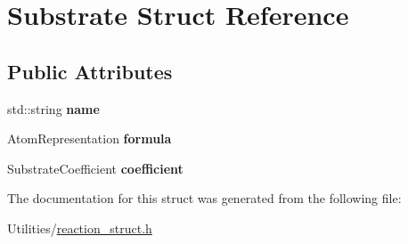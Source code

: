\hypertarget{struct_substrate}{}\section{Substrate Struct Reference}
\label{struct_substrate}
\subsection*{Public Attributes}
\begin{DoxyCompactItemize}
\item 
\mbox{\label{struct_substrate_aad4fceaa8aab6cbcac808dbbba666ef0}} 
std\+::string {\bfseries name}
\item 
\mbox{\label{struct_substrate_ada4d63f52eb096f47e33afe25062a173}} 
Atom\+Representation {\bfseries formula}
\item 
\mbox{\label{struct_substrate_a0f692ca3fb1fa7f1593b790784bda27f}} 
Substrate\+Coefficient {\bfseries coefficient}
\end{DoxyCompactItemize}


The documentation for this struct was generated from the following file\+:\begin{DoxyCompactItemize}
\item 
Utilities/\mbox{\hyperlink{reaction__struct_8h}{reaction\+\_\+struct.\+h}}\end{DoxyCompactItemize}
